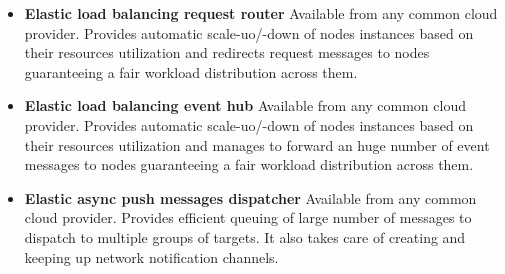 \begin{itemize}
\begin{itemize}
\item{\textbf{Elastic load balancing request router}}\newline
Available from any common cloud provider. Provides automatic scale-uo/-down of nodes instances based on their resources utilization and redirects request messages to nodes guaranteeing a fair workload distribution across them.
\item{\textbf{Elastic load balancing event hub}}\newline
Available from any common cloud provider. Provides automatic scale-uo/-down of nodes instances based on their resources utilization and manages to forward an huge number of event messages to nodes guaranteeing a fair workload distribution across them.
\item{\textbf{Elastic async push messages dispatcher}}\newline
Available from any common cloud provider. Provides efficient queuing of large number of messages to dispatch to multiple groups of targets. It also takes care of creating and keeping up network notification channels.
\end{itemize}


\end{itemize}
